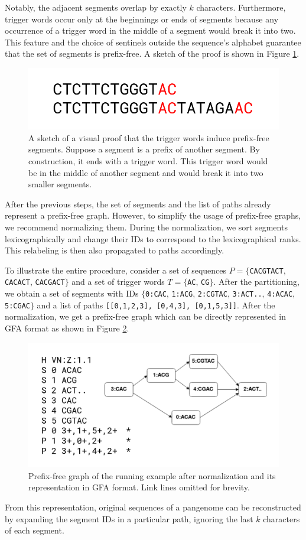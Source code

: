 Notably, the adjacent segments overlap by exactly $k$ characters.
Furthermore, trigger words occur only at the beginnings or ends of segments because any occurrence of a trigger word in the middle of a segment would break it into two.
This feature and the choice of sentinels outside the sequence's alphabet guarantee that the set of segments is prefix-free.
A sketch of the proof is shown in Figure \ref{fig:proof}.

\begin{figure}
    \centering
    \includegraphics[width=0.6\linewidth]{images/prefixfree_proof.png}
    \caption{
        A sketch of a visual proof that the trigger words induce prefix-free segments.
        Suppose a segment is a prefix of another segment.
        By construction, it ends with a trigger word.
        This trigger word would be in the middle of another segment and would break it into two smaller segments.
    }
    \label{fig:proof}
\end{figure}

After the previous steps, the set of segments and the list of paths already represent a prefix-free graph.
However, to simplify the usage of prefix-free graphs, we recommend normalizing them.
During the normalization, we sort segments lexicographically and change their IDs to correspond to the lexicographical ranks.
This relabeling is then also propagated to paths accordingly. 

To illustrate the entire procedure, consider a set of sequences $P = \{$\texttt{CACGTACT}, \texttt{CACACT}, \texttt{CACGACT}$\}$ and a set of trigger words $T = \{$\texttt{AC}, \texttt{CG}$\}$.
After the partitioning, we obtain a set of segments with IDs $\{$\texttt{0:CAC}, \texttt{1:ACG}, \texttt{2:CGTAC}, \texttt{3:ACT..}, \texttt{4:ACAC}, \texttt{5:CGAC}$\}$ and a list of paths \texttt{[[0,1,2,3], [0,4,3], [0,1,5,3]]}.
After the normalization, we get a prefix-free graph which can be directly represented in GFA format as shown in Figure \ref{fig:gfa}.

\begin{figure}
    \centering
    \includegraphics[width=\linewidth]{images/pfg_gfa.png}
    \caption{
        Prefix-free graph of the running example after normalization and its representation in GFA format.
        Link lines omitted for brevity.
    }
    \label{fig:gfa}
\end{figure}

From this representation, original sequences of a pangenome can be reconstructed by expanding the segment IDs in a particular path, ignoring the last $k$ characters of each segment.

